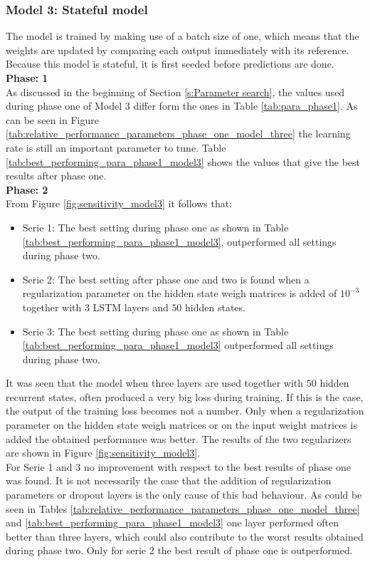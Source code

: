 \newpage
\subsubsection{Model 3: Stateful model}
The model is trained by making use of a batch size of one, which means that the weights are updated by comparing each output immediately with its reference. Because this model is stateful, it is first seeded before predictions are done.\\

\textbf{Phase: 1}\\
As discussed in the beginning of Section \ref{s:Parameter search}, the values used during phase one of Model 3 differ form the ones in Table \ref{tab:para_phase1}. As can be seen in Figure \ref{tab:relative_performance_parameters_phase_one_model_three} the learning rate is still an important parameter to tune. Table \ref{tab:best_performing_para_phase1_model3} shows the values that give the best results after phase one.\\ 

\textbf{Phase: 2}\\
From Figure \ref{fig:sensitivity_model3} it follows that:
\begin{itemize}
	\item Serie 1: The best setting during phase one as shown in Table \ref{tab:best_performing_para_phase1_model3}, outperformed all settings during phase two. 
	\item Serie 2: The best setting after phase one and two is found when a regularization parameter on the hidden state weigh matrices is added of $ 10^{-3} $ together with $ 3 $ LSTM layers and $ 50 $ hidden states.
	\item Serie 3: The best setting during phase one as shown in Table \ref{tab:best_performing_para_phase1_model3} outperformed all settings during phase two. 
\end{itemize}

It was seen that the model when three layers are used together with $ 50 $ hidden recurrent states, often produced a very big loss during training. If this is the case, the output of the training loss becomes not a number. Only when a regularization parameter on the hidden state weigh matrices or on the input weight matrices is added the obtained performance was better. The results of the two regularizers are shown in Figure \ref{fig:sensitivity_model3}.\\

For Serie 1 and 3 no improvement with respect to the best results of phase one was found. It is not necessarily the case that the addition of regularization parameters or dropout layers is the only cause of this bad behaviour. As could be seen in Tables \ref{tab:relative_performance_parameters_phase_one_model_three} and \ref{tab:best_performing_para_phase1_model3} one layer performed often better than three layers, which could also contribute to the worst results obtained during phase two. Only for serie 2 the best result of phase one is outperformed. \\

